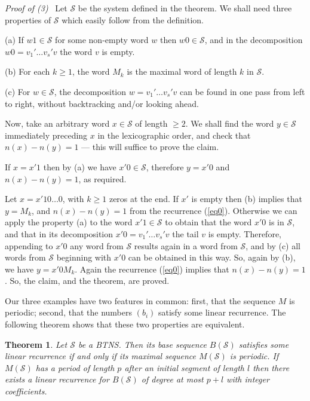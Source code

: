 \documentclass[12pt]{article}
\newtheorem{theorem}{Theorem}[section]
\newcommand{\head}[1]{\medbreak\noindent\textit{#1}\ }
\begin{document}
\head{Proof of (3)} Let $\mathcal{S}$ be the system defined in the theorem.
We shall need three properties of $\mathcal{S}$ which easily follow
from the definition.

(a) If $w1\in\mathcal{S}$ for some non-empty word $w$
then $w0\in\mathcal{S}$, and in the decomposition
$w0=v_1'\ldots v_s'v$ the word $v$ is empty.

(b) For each $k\geq 1$, the word $M_k$ is the maximal word of length $k$
in $\mathcal{S}$.

(c) For $w\in\mathcal{S}$, the decomposition $w=v_1'\ldots v_s'v$ can be found
in one pass from left to right, without backtracking and/or looking
ahead.

Now, take an arbitrary word $x\in\mathcal{S}$ of length $\geq 2$. We shall find
the word $y\in\mathcal{S}$ immediately preceding $x$ in the lexicographic
order, and check that $n(x)-n(y)=1$ --- this will suffice to prove the claim.

If $x=x'1$ then by (a) we have $x'0\in\mathcal{S}$, therefore $y=x'0$ and
$n(x)-n(y)=1$, as required.

Let $x=x'10\ldots 0$, with $k\geq 1$ zeros at the end.
If $x'$ is empty then (b) implies that $y=M_k$,
and $n(x)-n(y)=1$ from the recurrence (\ref{eq0}).
Otherwise we can apply the property (a) to the word $x'1\in\mathcal{S}$
to obtain that the word $x'0$ is in $\mathcal{S}$, and that in its
decomposition $x'0=v_1'\ldots v_s'v$ the tail $v$ is empty. Therefore,
appending to $x'0$ any word from $\mathcal{S}$ results again in a word from
$\mathcal{S}$, and by (c) all words from $\mathcal{S}$ beginning with
$x'0$ can be obtained in this way.
So, again by (b), we have $y=x'0M_k$. Again the recurrence (\ref{eq0})
implies that $n(x)-n(y)=1$. So, the claim, and the theorem, are proved.

\medbreak

Our three examples have two features in common: first, that the sequence
$M$ is periodic; second, that the numbers $(b_i)$ satisfy some linear
recurrence. The following theorem shows that these two properties are
equivalent.

\begin{theorem}\label{t2}
Let $\mathcal{S}$ be a BTNS. Then its base sequence $B(\mathcal{S})$ satisfies
some linear recurrence if and only if its maximal sequence $M(\mathcal{S})$ is 
periodic. If $M(\mathcal{S})$ has a period of length $p$ after an initial
segment of length $l$ then there exists a linear recurrence for
$B(\mathcal{S})$ of degree at most $p+l$ with integer coefficients.
\end{theorem}
\end{document}
